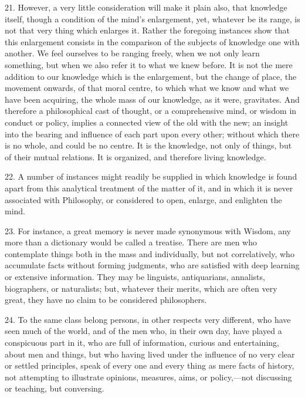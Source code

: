 21. However, a very little consideration will make it plain also,
that knowledge itself, though a condition of the mind's enlargement,
yet, whatever be its range, is not that very thing which enlarges it.
Rather the foregoing instances show that this enlargement consists in
the comparison of the subjects of knowledge one with another. We feel
ourselves to be ranging freely, when we not only learn something, but
when we also refer it to what we knew before. It is not the mere
addition to our knowledge which is the enlargement, but the change of
place, the movement onwards, of that moral centre, to which what we
know and what we have been acquiring, the whole mass of our knowledge,
as it were, gravitates. And therefore a philosophical cast of thought,
or a comprehensive mind, or wisdom in conduct or policy, implies a
connected view of the old with the new; an insight into the bearing
and influence of each part upon every other; without which there is no
whole, and could be no centre. It is the knowledge, not only of
things, but of their mutual relations. It is organized, and therefore
living knowledge.

22. A number of instances might readily be supplied in which
knowledge is found apart from this analytical treatment of the matter
of it, and in which it is never associated with Philosophy, or
considered to open, enlarge, and enlighten the mind.

23. For instance, a great memory is never made synonymous with
Wisdom, any more than a dictionary would be called a treatise. There
are men who contemplate things both in the mass and individually, but
not correlatively, who accumulate facts without forming judgments, who
are satisfied with deep learning or extensive information. They may be
linguists, antiquarians, annalists, biographers, or naturalists; but,
whatever their merits, which are often very great, they have no claim
to be considered philosophers.

24. To the same class belong persons, in other respects very
different, who have seen much of the world, and of the men who, in
their own day, have played a conspicuous part in it, who are full of
information, curious and entertaining, about men and things, but who
having lived under the influence of no very clear or settled
principles, speak of every one and every thing as mere facts of
history, not attempting to illustrate opinions, measures, aims, or
policy,—not discussing or teaching, but conversing.

